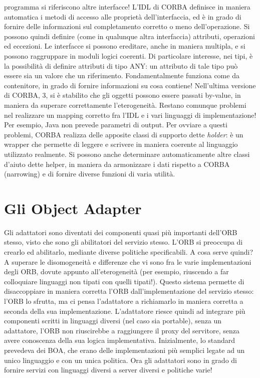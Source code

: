 programma si riferiscono altre interfacce!
L'IDL di CORBA definisce in maniera automatica i metodi di accesso alle proprietà dell'interfaccia, ed è in grado di
fornire delle informazioni sul completamento corretto o meno dell'operazione. Si possono quindi definire (come
in qualunque altra interfaccia) attributi, operazioni ed eccezioni. Le interfacce si possono ereditare, anche in maniera
multipla, e si possono raggruppare in moduli logici coerenti.
Di particolare interesse, nei tipi, è la possibilità di definire attributi di tipo ANY: un attributo di tale tipo può
essere sia un valore che un riferimento. Fondamentalmente funziona come da contenitore, in grado di fornire informazioni
su cosa contiene! Nell'ultima versione di CORBA, 3, si è stabilito che gli oggetti possono essere passati by-value, in
maniera da superare correttamente l'eterogeneità.
Restano comunque problemi nel realizzare un mapping corretto fra l'IDL e i vari linguaggi di implementazione! Per
esempio, Java non prevede parametri di output. Per ovviare a questi problemi, CORBA realizza delle apposite classi di supporto dette
\textit{holder}: è un wrapper che permette di leggere e scrivere in maniera coerente al linguaggio utilizzato realmente.
Si possono anche determinare automaticamente altre classi d'aiuto dette helper, in maniera da armonizzare i dati
rispetto a CORBA (narrowing) e di fornire diverse funzioni di varia utilità.
\section{Gli Object Adapter}
Gli adattatori sono diventati dei componenti quasi più importanti dell'ORB stesso, visto che sono gli abilitatori del
servizio stesso. L'ORB si preoccupa di crearlo ed abilitarlo, mediante diverse politiche specificabili.
A cosa serve quindi? A superare le disomogeneità e differenze che vi sono fra le varie implementazioni degli ORB, dovute
appunto all'eterogeneità (per esempio, riuscendo a far colloquiare linguaggi non tipati con quelli tipati!).
Questo sistema permette di disaccoppiare in maniera corretta l'ORB dall'implementazione del servizio stesso: l'ORB lo
sfrutta, ma ci pensa l'adattatore a richiamarlo in maniera corretta a seconda della sua implementazione. L'adattatore
riesce quindi ad integrare più componenti scritti in linguaggi diversi (nel caso sia portable), senza un adattatore, l'ORB non riuscirebbe a
raggiungere il proxy del servitore, senza avere conoscenza della sua logica implementativa.
Inizialmente, lo standard prevedeva dei BOA, che erano delle implementazioni più semplici legate ad un unico linguaggio e con un unica politica. Ora gli adattatori sono in
grado di fornire servizi con linguaggi diversi a server diversi e politiche varie!
